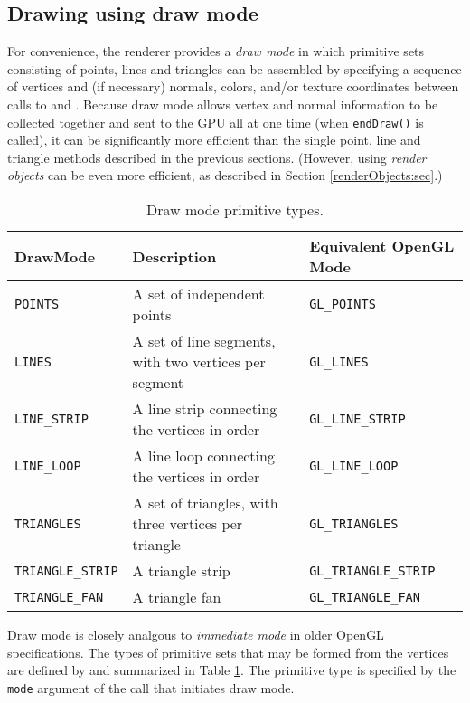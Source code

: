 \subsection{Drawing using draw mode}
\label{drawMode:sec}

For convenience, the renderer provides a {\it draw mode} in which
primitive sets consisting of points, lines and triangles can be assembled
by specifying a sequence of vertices and (if necessary) normals,
colors, and/or texture coordinates between calls to
and . Because draw mode
allows vertex and normal information to be collected together and sent
to the GPU all at one time (when {\tt endDraw()} is called), it can be
significantly more efficient than the single point, line and triangle
methods described in the previous sections. (However, using {\it
render objects} can be even more efficient, as described in Section
\ref{renderObjects:sec}.)

\begin{table}[h]
\begin{center}
\begin{tabular}{|lll|}
\hline
DrawMode & Description & Equivalent OpenGL Mode\\
\hline
{\tt POINTS} & A set of independent points & {\tt GL\_POINTS} \\
{\tt LINES} & A set of line segments, with two vertices 
per segment & {\tt GL\_LINES}\\
{\tt LINE\_STRIP} & A line strip connecting the vertices in order &
{\tt GL\_LINE\_STRIP}\\
{\tt LINE\_LOOP} & A line loop connecting the vertices in order &
{\tt GL\_LINE\_LOOP}\\
{\tt TRIANGLES} & A set of triangles, with three vertices
per triangle & {\tt GL\_TRIANGLES}\\
{\tt TRIANGLE\_STRIP} & A triangle strip & {\tt GL\_TRIANGLE\_STRIP} \\
{\tt TRIANGLE\_FAN} & A triangle fan &
{\tt GL\_TRIANGLE\_FAN}\\
\hline
\end{tabular}
\end{center}
\caption{Draw mode primitive types.}
\label{DrawMode:tab}
\end{table}

Draw mode is closely analgous to {\it immediate mode} in older
OpenGL specifications. The types of primitive sets that may be formed from
the vertices are defined by
 and summarized in Table
\ref{DrawMode:tab}.
The primitive type is specified by the {\tt mode} argument of the
call that initiates draw mode.

